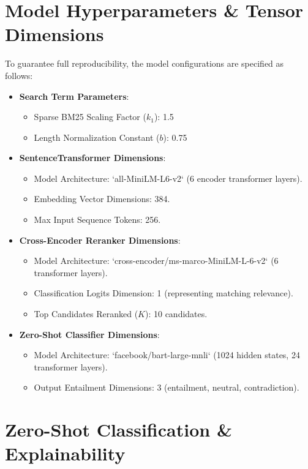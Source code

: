 \documentclass[11pt,journal,onecolumn]{IEEEtran}
\begin{document}
\section{Model Hyperparameters \& Tensor Dimensions}
To guarantee full reproducibility, the model configurations are specified as follows:
\begin{itemize}
    \item \textbf{Search Term Parameters}:
    \begin{itemize}
        \item Sparse BM25 Scaling Factor ($k_1$): 1.5
        \item Length Normalization Constant ($b$): 0.75
    \end{itemize}
    \item \textbf{SentenceTransformer Dimensions}:
    \begin{itemize}
        \item Model Architecture: `all-MiniLM-L6-v2` (6 encoder transformer layers).
        \item Embedding Vector Dimensions: 384.
        \item Max Input Sequence Tokens: 256.
    \end{itemize}
    \item \textbf{Cross-Encoder Reranker Dimensions}:
    \begin{itemize}
        \item Model Architecture: `cross-encoder/ms-marco-MiniLM-L-6-v2` (6 transformer layers).
        \item Classification Logits Dimension: 1 (representing matching relevance).
        \item Top Candidates Reranked ($K$): 10 candidates.
    \end{itemize}
    \item \textbf{Zero-Shot Classifier Dimensions}:
    \begin{itemize}
        \item Model Architecture: `facebook/bart-large-mnli` (1024 hidden states, 24 transformer layers).
        \item Output Entailment Dimensions: 3 (entailment, neutral, contradiction).
    \end{itemize}
\end{itemize}

\section{Zero-Shot Classification \& Explainability}
\end{document}
